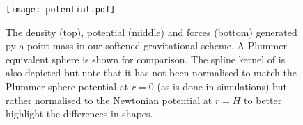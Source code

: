 \begin{figure}
\texttt{[image: potential.pdf]}
\caption{The density (top), potential (middle) and forces (bottom)
  generated py a point mass in our softened gravitational scheme.  A
  Plummer-equivalent sphere is shown for comparison. The spline kernel
  of \citet{Monaghan1985} is also depicted but note that it has not
  been normalised to match the Plummer-sphere potential at $r=0$ (as
  is done in simulations) but rather normalised to the Newtonian
  potential at $r=H$ to better highlight the differences in shapes.}
\label{fig:fmm:softening}
\end{figure}
